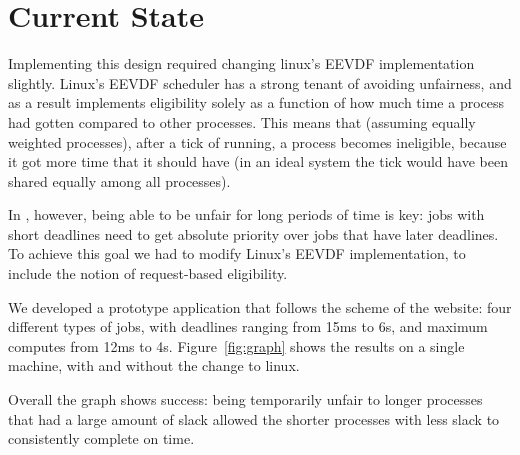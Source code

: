 \section{Current State}

Implementing this design required changing linux's EEVDF implementation
slightly. Linux's EEVDF scheduler has a strong tenant of avoiding unfairness,
and as a result implements eligibility solely as a function of how much time a
process had gotten compared to other processes. This means that (assuming
equally weighted processes), after a tick of running, a process becomes
ineligible, because it got more time that it should have (in an ideal system the
tick would have been shared equally among all processes).

In \sysname, however, being able to be unfair for long periods of time is key:
jobs with short deadlines need to get absolute priority over jobs that have
later deadlines. To achieve this goal we had to modify Linux's EEVDF
implementation, to include the notion of request-based eligibility.

We developed a prototype application that follows the scheme of the website:
four different types of jobs, with deadlines ranging from 15ms to 6s, and
maximum computes from 12ms to 4s. Figure~\ref{fig:graph} shows the results on a
single machine, with and without the change to linux. 

Overall the graph shows success: being temporarily unfair to longer processes
that had a large amount of slack allowed the shorter processes with less slack
to consistently complete on time.